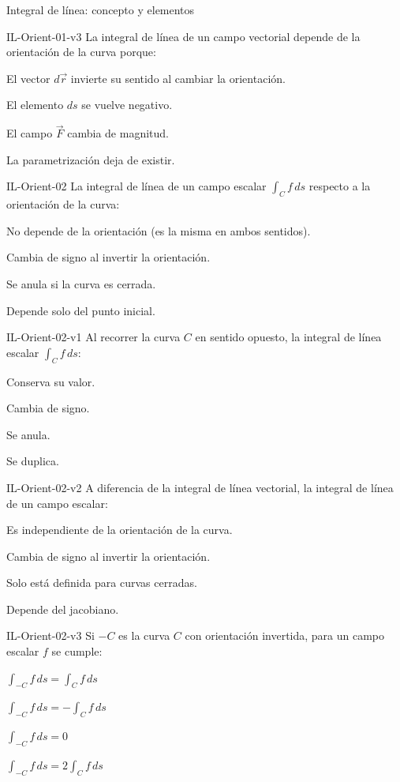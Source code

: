 \documentclass[a4,11pt]{aleph-notas}
\begin{document}
\begin{quiz}{Integral de línea: concepto y elementos}
\begin{multi}[]%
    {IL-Orient-01-v3}
    La integral de línea de un campo vectorial depende de la orientación de la curva porque:
    \item* El vector $d\vec{r}$ invierte su sentido al cambiar la orientación.
    \item El elemento $ds$ se vuelve negativo.
    \item El campo $\vec{F}$ cambia de magnitud.
    \item La parametrización deja de existir.
\end{multi}

\begin{multi}[]%
    {IL-Orient-02}
    La integral de línea de un campo escalar $\displaystyle\int_C f\,ds$ respecto a la orientación de la curva:
    \item* No depende de la orientación (es la misma en ambos sentidos).
    \item Cambia de signo al invertir la orientación.
    \item Se anula si la curva es cerrada.
    \item Depende solo del punto inicial.
\end{multi}

\begin{multi}[]%
    {IL-Orient-02-v1}
    Al recorrer la curva $C$ en sentido opuesto, la integral de línea escalar $\displaystyle\int_C f\,ds$:
    \item* Conserva su valor.
    \item Cambia de signo.
    \item Se anula.
    \item Se duplica.
\end{multi}

\begin{multi}[]%
    {IL-Orient-02-v2}
    A diferencia de la integral de línea vectorial, la integral de línea de un campo escalar:
    \item* Es independiente de la orientación de la curva.
    \item Cambia de signo al invertir la orientación.
    \item Solo está definida para curvas cerradas.
    \item Depende del jacobiano.
\end{multi}

\begin{multi}[]%
    {IL-Orient-02-v3}
    Si $-C$ es la curva $C$ con orientación invertida, para un campo escalar $f$ se cumple:
    \item* $\displaystyle\int_{-C} f\,ds = \int_{C} f\,ds$
    \item $\displaystyle\int_{-C} f\,ds = -\int_{C} f\,ds$
    \item $\displaystyle\int_{-C} f\,ds = 0$
    \item $\displaystyle\int_{-C} f\,ds = 2\int_{C} f\,ds$
\end{multi}

\end{quiz}
\end{document}
